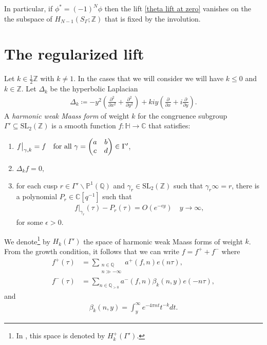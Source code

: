 \documentclass[twoside,a4paper,10pt]{article} %
\newcommand{\8}{\infty}
\newcommand{\Z}{\mathbb{Z}}
\newcommand{\SL}{\mathrm{SL}}
\newcommand{\HH}{\mathbb{H}}
\newcommand{\Q}{\mathbb{Q}}
\newcommand{\C}{\mathbb{C}}
\newcommand{\PP}{\mathbb{P}}
\newcommand\restr[2]{{%
  \left.\kern-\nulldelimiterspace %
  #1 %
  \vphantom{\big|} %
  \right|_{#2} %
  }}
\theoremstyle{mytheoremstyle}
\theoremstyle{remark}
\numberwithin{equation}{section}
\begin{document}
In particular, if $\phi^\ast=(-1)^N\phi$ then the lift \eqref{theta lift at zero} vanishes on the the subspace of $H_{N-1}(S_\Gamma;\Z)$ that is fixed by the involution.

\section{The regularized lift}

Let $k \in \frac{1}{2}\Z$ with $k \neq 1$. In the cases that we will consider we will have $k \leq 0$ and $k \in \Z$. Let $\Delta_{k}$ be the hyperbolic Laplacian
\begin{align}
\Delta_k \coloneqq -y^2 \left (\frac{\partial^2}{\partial x^2}+\frac{\partial^2}{\partial y^2} \right )+kiy\left (\frac{\partial}{\partial x}+i\frac{\partial}{\partial y} \right ).
\end{align}
 A {\em harmonic weak Maass form} of weight $k$ for the congruence subgroup $\Gamma'\subseteq \SL_2(\Z)$ is a smooth function $f \colon \HH \longrightarrow \C$ that satisfies:
\begin{enumerate}
\item $\restr{f}{\gamma,k}=f \quad \textrm{for all} \ \gamma=\begin{pmatrix}
a & b \\ c & d
\end{pmatrix} \in \Gamma'$,
\item $\Delta_k f=0,$
\item for each cusp $r \in \Gamma' \backslash \PP^1(\Q)$ and $\gamma_r \in \SL_2(\Z)$ such that $\gamma_r \8=r$, there is a polynomial $P_{r} \in \C[q^{-1}]$ such that
\begin{align} \label{growth}
f \vert_{\gamma_r}(\tau)-P_r(\tau)=O(e^{-\epsilon y}) \quad y \rightarrow \8,
\end{align}
for some $\epsilon >0$.
\end{enumerate}
We denote\footnote{In \cite{BF04}, this space is denoted by $H^+_k(\Gamma')$.} by $H_k(\Gamma')$ the space of harmonic weak Maass forms of weight $k$. From the growth condition, it follows that we can write $f=f^++f^-$ where 
\begin{align}
f^+(\tau)& = \sum_{\substack{n \in \Q \\ n \gg -\8}}a^+(f,n)e(n\tau), \\
f^-(\tau)& = \sum_{n \in \Q_{>0}}a^-(f,n)\beta_k(n,y) e(-n\tau),
\end{align}
and
\begin{align}
\beta_k(n,y)=\int_y^\8e^{-4\pi n t}t^{-k}dt.
\end{align}
\end{document}
